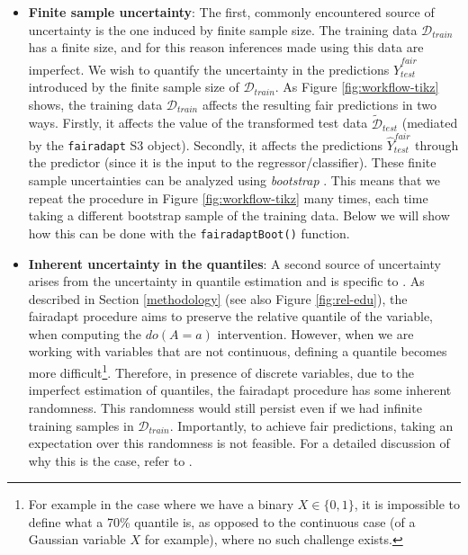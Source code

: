 \documentclass[
  nojss]{jss}
\begin{document}
\begin{itemize}
\item
  \textbf{Finite sample uncertainty}: The first, commonly encountered
  source of uncertainty is the one induced by finite sample size. The
  training data \(\mathcal{D}_{train}\) has a finite size, and for this
  reason inferences made using this data are imperfect. We wish to
  quantify the uncertainty in the predictions
  \(\widehat{Y}^{fair}_{test}\) introduced by the finite sample size of
  \(\mathcal{D}_{train}\). As Figure \ref{fig:workflow-tikz} shows, the
  training data \(\mathcal{D}_{train}\) affects the resulting fair
  predictions in two ways. Firstly, it affects the value of the
  transformed test data \(\widetilde{\mathcal{D}}_{test}\) (mediated by
  the \texttt{fairadapt} S3 object). Secondly, it affects the
  predictions \(\widehat{Y}^{fair}_{test}\) through the predictor (since
  it is the input to the regressor/classifier). These finite sample
  uncertainties can be analyzed using \emph{bootstrap}
  \citep{efron1994introduction}. This means that we repeat the procedure
  in Figure \ref{fig:workflow-tikz} many times, each time taking a
  different bootstrap sample of the training data. Below we will show
  how this can be done with the \texttt{fairadaptBoot()} function.
\item
  \textbf{Inherent uncertainty in the quantiles}: A second source of
  uncertainty arises from the uncertainty in quantile estimation and is
  specific to . As described in Section \ref{methodology}
  (see also Figure \ref{fig:rel-edu}), the fairadapt procedure aims to
  preserve the relative quantile of the variable, when computing the
  \(do(A=a)\) intervention. However, when we are working with variables
  that are not continuous, defining a quantile becomes more
  difficult\footnote{For example in the case where we have a binary $X \in \lbrace 0, 1 \rbrace$, it is impossible to define what a 70\% quantile is, as opposed to the continuous case (of a Gaussian variable $X$ for example), where no such challenge exists.}.
  Therefore, in presence of discrete variables, due to the imperfect
  estimation of quantiles, the fairadapt procedure has some inherent
  randomness. This randomness would still persist even if we had
  infinite training samples in \(\mathcal{D}_{train}\). Importantly, to
  achieve fair predictions, taking an expectation over this randomness
  is not feasible. For a detailed discussion of why this is the case,
  refer to \citep[Section~5]{plecko2020fair}.
\end{itemize}
\end{document}
